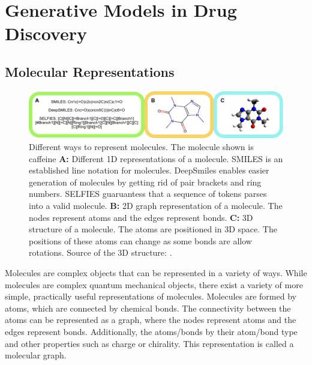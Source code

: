 

\section{Generative Models in Drug Discovery\label{sec:generative-models}}
\subsection{Molecular Representations}
\begin{figure}
    \centering
    \includegraphics[width=\textwidth]{figures/representations/representations.pdf}
    \caption{Different ways to represent molecules. The molecule shown 
    is caffeine \textbf{A:} Different 1D representations of a molecule. SMILES is an established 
    line notation for molecules. DeepSmiles enables easier generation of
    molecules by getting rid of pair brackets and ring numbers. SELFIES
    guaruantess that a sequence of tokens parses into a valid molecule.
    \textbf{B:} 2D graph representation of a molecule. The nodes represent
    atoms and the edges represent bonds. 
    \textbf{C:} 3D structure of a molecule. The atoms are positioned in 3D
    space. The positions of these atoms can change as some bonds are 
    allow rotations. Source of the 3D structure: \citep{EnglishCaffeine3D2010}.
    \label{fig:molecular-graph}}
\end{figure}
Molecules are complex objects that can be represented in a variety of ways.
While molecules are complex quantum mechanical objects, there exist 
a variety of more simple, practically useful representations of molecules.
Molecules are formed by atoms, which are connected by chemical bonds.
The connectivity between the atoms can be represented as a graph, where
the nodes represent atoms and the edges represent bonds. Additionally,
the atoms/bonds by their atom/bond type and other properties such as
charge or chirality. This representation is called a molecular graph.

